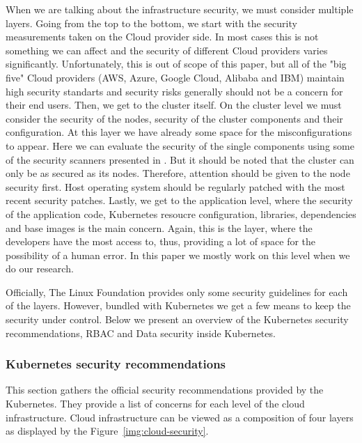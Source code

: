When we are talking about the infrastructure security, we must consider multiple layers. Going from the top to the bottom, we start with the security measurements taken on the Cloud provider side. In most cases this is not something we can affect and the security of different Cloud providers varies significantly. Unfortunately, this is out of scope of this paper, but all of the "big five" Cloud providers (AWS, Azure, Google Cloud, Alibaba and IBM) maintain high security standarts and security risks generally should not be a concern for their end users. Then, we get to the cluster itself. On the cluster level we must consider the security of the nodes, security of the cluster components and their configuration. At this layer we have already some space for the misconfigurations to appear. Here we can evaluate the security of the single components using some of the security scanners presented in . But it should be noted that the cluster can only be as secured as its nodes. Therefore, attention should be given to the node security first. Host operating system should be regularly patched with the most recent security patches. Lastly, we get to the application level, where the security of the application code, Kubernetes resoucre configuration, libraries, dependencies and base images is the main concern. Again, this is the layer, where the developers have the most access to, thus, providing a lot of space for the possibility of a human error. In this paper we mostly work on this level when we do our research.

Officially, The Linux Foundation provides only some security guidelines for each of the layers. However, bundled with Kubernetes we get a few means to keep the security under control. Below we present an overview of the Kubernetes security recommendations, RBAC and Data security inside Kubernetes.

\subsubsection*{Kubernetes security recommendations}

This section gathers the official security recommendations provided by the Kubernetes. They provide a list of concerns for each level of the cloud infrastructure. Cloud infrastructure can be viewed as a composition of four layers as displayed by the Figure~\ref{img:cloud-security}.

